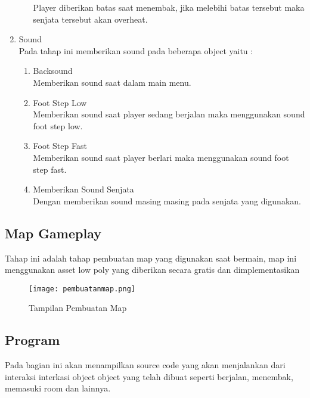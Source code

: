 \begin{enumerate}
\begin{enumerate}
        Player diberikan batas saat menembak, jika melebihi batas tersebut maka senjata tersebut akan overheat.
    \end{enumerate}
    \item Sound \\
    Pada tahap ini memberikan sound pada beberapa object yaitu :
    \begin{enumerate}
        \item Backsound \\
        Memberikan sound saat dalam main menu.
        \item Foot Step Low \\ 
        Memberikan sound saat player sedang berjalan maka menggunakan sound foot step low.
        \item Foot Step Fast \\
        Memberikan sound saat player berlari maka menggunakan sound foot step fast.
        \item Memberikan Sound Senjata \\ 
        Dengan memberikan sound masing masing pada senjata yang digunakan.
    \end{enumerate}
\end{enumerate}

\subsection{Map Gameplay}
Tahap ini adalah tahap pembuatan map yang digunakan saat bermain, map ini menggunakan asset low poly yang diberikan secara gratis dan dimplementasikan
\begin{figure}[h]
    \centering
    \texttt{[image: pembuatanmap.png]}
    \caption{Tampilan Pembuatan Map}
    \label{fig:pembuatanmap}
\end{figure}

\newpage
\subsection{Program}
\noindent

Pada bagian ini akan menampilkan source code yang akan menjalankan dari interaksi interkasi object object yang telah dibuat seperti berjalan, menembak, memasuki room dan lainnya.

